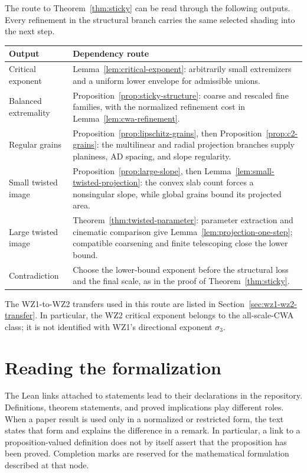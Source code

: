 The route to Theorem~\ref{thm:sticky} can be read through the following
outputs. Every refinement in the structural branch carries the same
selected shading into the next step.

\begin{center}
\begin{tabular}{p{}p{}}
Output & Dependency route \\
\hline
Critical exponent & Lemma~\ref{lem:critical-exponent}: arbitrarily
small extremizers and a uniform lower envelope for admissible unions. \\
Balanced extremality & Proposition~\ref{prop:sticky-structure}:
coarse and rescaled fine families, with the normalized refinement
cost in Lemma~\ref{lem:cwa-refinement}. \\
Regular grains & Proposition~\ref{prop:lipschitz-grains}, then
Proposition~\ref{prop:c2-grains}: the multilinear and radial projection
branches supply planiness, AD spacing, and slope regularity. \\
Small twisted image & Proposition~\ref{prop:large-slope}, then
Lemma~\ref{lem:small-twisted-projection}: the convex slab count forces
a nonsingular slope, while global grains bound its projected area. \\
Large twisted image & Theorem~\ref{thm:twisted-parameter}: parameter
extraction and cinematic comparison give
Lemma~\ref{lem:projection-one-step}; compatible coarsening and finite
telescoping close the lower bound. \\
Contradiction & Choose the lower-bound exponent before the structural
loss and the final scale, as in the proof of Theorem~\ref{thm:sticky}.
\end{tabular}
\end{center}

The WZ1-to-WZ2 transfers used in this route are listed in
Section~\ref{sec:wz1-wz2-transfer}. In particular, the WZ2 critical
exponent belongs to the all-scale-CWA class; it is not identified
with WZ1's directional exponent $\sigma_3$.

\section{Reading the formalization}

The Lean links attached to statements lead to their declarations in the
repository. Definitions, theorem statements, and proved implications
play different roles. When a paper result is used only in a normalized
or restricted form, the text states that form and explains the
difference in a remark. In particular, a link to a proposition-valued
definition does not by itself assert that the proposition has been
proved. Completion marks are reserved for the mathematical formulation
described at that node.

